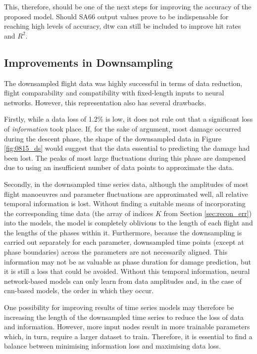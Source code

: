 This, therefore, should be one of the next steps for improving the accuracy of the proposed model. Should SA66 output values prove to be indispensable for reaching high levels of accuracy, \ac{dtw} can still be included to improve hit rates and \(R^2\).

\subsection{Improvements in Downsampling} \label{sec:disc:downsampling}
The downsampled flight data was highly successful in terms of data reduction, flight comparability and compatibility with fixed-length inputs to neural networks. However, this representation also has several drawbacks.

Firstly, while a data loss of 1.2\% is low, it does not rule out that a significant loss of \textit{information} took place. If, for the sake of argument, most damage occurred during the descent phase, the shape of the downsampled data in Figure \ref{fig:0815_ds} would suggest that the data essential to predicting the damage had been lost. %
The peaks of most large fluctuations during this phase are dampened due to using an insufficient number of data points to approximate the data.

Secondly, in the downsampled time series data, although the amplitudes of most flight manoeuvres and parameter fluctuations are approximated well, all relative temporal information is lost. Without finding a suitable means of incorporating the corresponding time data (the array of indices \(K\) from Section \ref{sec:recon_err}) into the models, the model is completely oblivious to the length of each flight and the lengths of the phases within it. Furthermore, because the downsampling is carried out separately for each parameter, downsampled time points (except at phase boundaries) across the parameters are not necessarily aligned. This information may not be as valuable as phase duration for damage prediction, but it is still a loss that could be avoided. Without this temporal information, neural network-based models can only learn from data amplitudes and, in the case of \ac{cnn}-based models, the order in which they occur.

One possibility for improving results of time series models may therefore be increasing the length of the downsampled time series to reduce the loss of data and information. However, more input nodes result in more trainable parameters which, in turn, require a larger dataset to train. Therefore, it is essential to find a balance between minimising information loss and maximising data loss.

